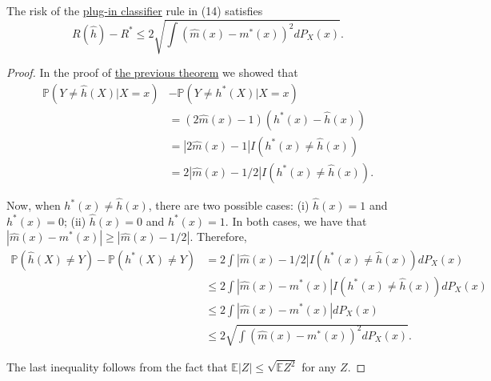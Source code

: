 \begin{theorem}
  \label{thm:classification-risk-bounded-by-regression-risk}
  The risk of the \hyperref[def:plug-in-classifier]{plug-in classifier} rule in (14) satisfies
  \begin{equation}
    R(\hat{h}) - R^\ast \leq 2\sqrt{\int (\hat{m}(x) - m^\ast(x))^2 dP_X(x)}.
  \end{equation}
\end{theorem}
\begin{proof}
  In the proof of \href{thm:bayes_optimality}{the previous theorem} we showed that
  \begin{align}
    \mathbb{P}(Y \neq \hat{h}(X)|X = x) 
    & - \mathbb{P}(Y \neq h^{\ast}(X)|X = x) \\ 
    & = (2\hat{m}(x) - 1)(h^{\ast}(x) - \hat{h}(x)) \\
    & = |2\hat{m}(x) - 1|I(h^{\ast}(x) \neq \hat{h}(x)) \\ 
    & = 2|\hat{m}(x) - 1/2|I(h^{\ast}(x) \neq \hat{h}(x)).
  \end{align}
  
  Now, when $h^{\ast}(x) \neq \hat{h}(x)$, there are two possible cases: (i) $\hat{h}(x) = 1$ and $h^{\ast}(x) = 0$; (ii) $\hat{h}(x) = 0$ and $h^{\ast}(x) = 1$. In both cases, we have that $|\hat{m}(x) - m^{\ast}(x)| \geq |\hat{m}(x) - 1/2|$. Therefore,
  \begin{align}
    \mathbb{P}(\hat{h}(X) \neq Y) - \mathbb{P}(h^{\ast}(X) \neq Y) &= 2\int |\hat{m}(x) - 1/2|I(h^{\ast}(x) \neq \hat{h}(x))dP_X(x) \\
    &\leq 2\int |\hat{m}(x) - m^{\ast}(x)|I(h^{\ast}(x) \neq \hat{h}(x))dP_X(x) \\
    &\leq 2\int |\hat{m}(x) - m^{\ast}(x)|dP_X(x) \tag{15} \\
    &\leq 2\sqrt{\int (\hat{m}(x) - m^{\ast}(x))^2 dP_X(x)}. \tag{16}
  \end{align}
  
  The last inequality follows from the fact that $\mathbb{E}|Z| \leq \sqrt{\mathbb{E}Z^2}$ for any $Z$.
\end{proof}

